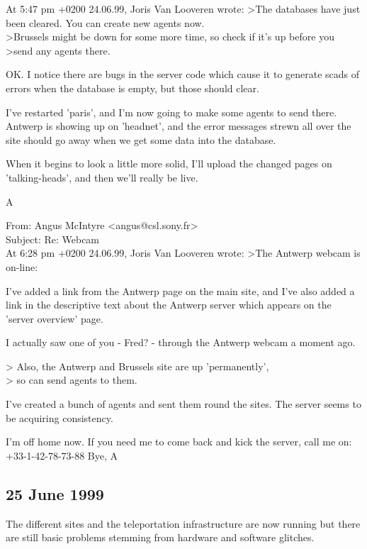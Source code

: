 {\begin{mail}
At 5:47 pm +0200 24.06.99, Joris Van Looveren wrote:
>The databases have just been cleared. You can create new agents now.
\\>Brussels might be down for some more time, so check if it's up before you
\\>send any agents there.

OK. I notice there are bugs in the server code which cause it to 
generate scads of errors when the database is empty, but those should clear.

I've restarted 'paris', and I'm now going to make some agents to 
send there. Antwerp is showing up on 'headnet', and the error 
messages strewn all over the site should go away when we get 
some data into the database.

When it begins to look a little more solid, I'll upload the 
changed pages on 'talking-heads', and then we'll really be live.

	A
\end{mail}
\begin{mail}
From: Angus McIntyre <angus@csl.sony.fr>\\
Subject: Re: Webcam\\

At 6:28 pm +0200 24.06.99, Joris Van Looveren wrote:
>The Antwerp webcam is on-line:

I've added a link from the Antwerp page on the main site, 
and I've also added a link in the descriptive text about 
the Antwerp server which appears on the 'server overview' page. 

I actually saw one of you - Fred? - through the Antwerp 
webcam a moment ago.

> Also, the Antwerp and Brussels site are up 'permanently', 
\\> so can send agents to them.

I've created a bunch of agents and sent them round the sites. 
The server seems to be acquiring consistency.

I'm off home now. If you need me to come back and kick 
the server, call me on:
	+33-1-42-78-73-88
Bye,
	A
\end{mail}
}

\subsection*{25 June 1999} 

The different sites and the teleportation infrastructure are now running but there are still basic problems 
stemming from hardware and software glitches. 


